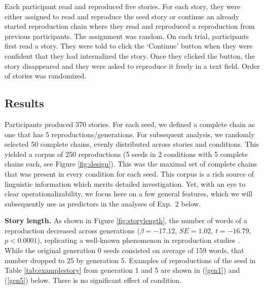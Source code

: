 \documentclass[10pt,letterpaper]{article}
\newcommand{\mf}[1]{\textcolor{PinkyPurple}{[mf: #1]}}
\begin{document}
Each participant read and reproduced five stories. For each story, they were either assigned to read and reproduce the seed story or continue an already started reproduction chain where they read and reproduced a reproduction from previous participants. The assignment was random.
 On each trial, participants first read a story. They were told to click the `Continue' button when they were confident that they had internalized the story. Once they clicked the button, the story disappeared and they were asked to reproduce it freely in a text field. Order of stories was randomized.

\subsection{Results}

Participants produced 370 stories. For each seed, we defined a complete chain as one that has 5 reproductions/generations. For subsequent analysis, we randomly selected 50 complete chains, evenly distributed across stories and conditions. This yielded a corpus of 250 reproductions (5 seeds in 2 conditions with 5 complete chains each, see Figure \ref{fig:design}). This was the maximal set of complete chains that was present in every condition for each seed. This corpus is a rich source of linguistic information which merits detailed investigation. Yet, with an eye to clear operationalizability, we focus here on a few general features, which we will subsequently use as predictors in the analyses of Exp.~2 below.

\textbf{Story length.} As shown in Figure \ref{fig:storylength}, the number of words of a reproduction decreased across generations ($\beta = -17.12$, $SE = 1.02$, $t = -16.79$, $p < 0.0001$), replicating a well-known phenomenon in reproduction studies \cite{Bartlett:1932}. While the original generation 0 seeds consisted on average of 159 words, that number dropped to 25 by generation 5. Examples of reproductions of the seed in Table \ref{tab:examplestory} from generation 1 and 5 are shown in (\ref{gen1}) and (\ref{gen5}) below. There is no significant effect of condition.
\end{document}

